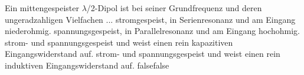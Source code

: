     {Ein mittengespeister $\lambda$/2-Dipol ist bei seiner Grundfrequenz und deren ungeradzahligen Vielfachen ...}
    {stromgespeist, in Serienresonanz und am Eingang niederohmig.}
    {spannungsgespeist, in Parallelresonanz und am Eingang hochohmig.}
    {strom- und spannungsgespeist und weist einen rein kapazitiven Eingangswiderstand auf.}
    {strom- und spannungsgespeist und weist einen rein induktiven Eingangswiderstand auf.}
    {false}{false}